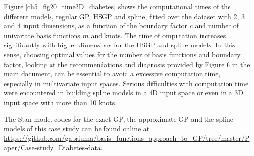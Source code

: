 \documentclass[onecolumn,a4paper,11pt]{article}
\begin{document}
Figure \ref{ch5_fig20_time2D_diabetes} shows the computational times of the different models, regular GP, HSGP and spline, fitted over the dataset with 2, 3 and 4 input dimensions, as a function of the boundary factor $c$ and number of univariate basis functions $m$ and knots. The time of omputation increases significantly with higher dimensions for the HSGP and spline models. In this sense, choosing optimal values for the number of basis functions and boundary factor, looking at the recommendations and diagnosis provided by Figure 6 %
in the main document, can be essential to avoid a excessive computation time, especially in multivariate input spaces. Serious difficulties with computation time were encountered in building spline models in a 4D input space or even in a 3D input space with more than 10 knots.

The Stan model codes for the exact GP, the approximate GP and the spline models of this case study can be found online at {\small \url{https://github.com/gabriuma/basis_functions_approach_to_GP/tree/master/Paper/Case-study_Diabetes-data}}.
\end{document}
